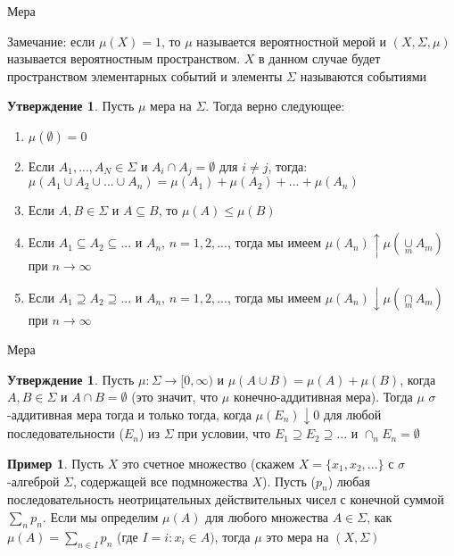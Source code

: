 \documentclass{beamer}%
\theoremstyle{definition}
\newtheorem{proposition}[theorem]{Утверждение}
\newtheorem{myexample}[theorem]{Пример}
\begin{document}
\begin{frame}{Мера}

Замечание: если $\mu(X) = 1$, то $\mu$ называется вероятностной мерой и $(X, \Sigma, \mu)$ называется вероятностным пространством.  $X$ в данном случае будет пространством элементарных событий и элементы $\Sigma$ называются событиями

\begin{proposition}
Пусть $\mu$ мера на $\Sigma$. Тогда верно следующее:
    \begin{enumerate}
        \item $\mu(\emptyset) = 0$
        \item Если $A_1,...,A_N \in \Sigma$ и $A_i \cap A_j =         \emptyset$ для $i \neq j$, тогда:
            $\mu(A_1 \cup A_2 \cup ... \cup A_n) = \mu(A_1) + \mu(A_2) + ... + \mu(A_n)$
        \item Если $A, B \in \Sigma$ и $A \subseteq B$, то $\mu(A) \leq \mu(B)$
        \item Если $A_1 \subseteq A_2 \subseteq ...$ и $A_n$, $n = 1,2,...$, тогда мы имеем $\mu(A_n) \uparrow \mu(\cup\limits_{m}A_m)$ при $n \rightarrow \infty$
        \item Если $A_1 \supseteq A_2 \supseteq ...$ и $A_n$, $n = 1,2,...$, тогда мы имеем $\mu(A_n) \downarrow \mu(\cap\limits_{m}A_m)$ при $n \rightarrow \infty$
    \end{enumerate}
\end{proposition}
    
\end{frame}

\begin{frame}{Мера}
    \begin{proposition}
        Пусть $\mu: \Sigma \rightarrow [0, \infty)$ и $\mu(A \cup B) = \mu(A) + \mu(B)$, когда $A, B \in \Sigma$ и $A \cap B = \emptyset$ (это значит, что $\mu$ конечно-аддитивная мера). Тогда $\mu$ $\sigma$-аддитивная мера тогда и только тогда, когда $\mu(E_n) \downarrow 0$ для любой последовательности ($E_n$) из $\Sigma$ при условии, что $E_1 \supseteq E_2 \supseteq ...$ и $\cap_{n} E_n = \emptyset$
    \end{proposition}
    \begin{myexample}
        Пусть $X$ это счетное множество (скажем $X = \{x_1, x_2, ...\}$ с $\sigma$-алгеброй $\Sigma$, содержащей все подмножества $X$). Пусть ($p_n$) любая последовательность неотрицательных действительных чисел с конечной суммой $\sum_n p_n$. Если мы определим $\mu(A)$ для любого множества $A \in \Sigma$, как $\mu(A) = \sum_{n \in I} p_n$ (где $I = {i: x_i \in A})$, тогда $\mu$ это мера на $(X, \Sigma)$
    \end{myexample}
\end{frame}
\end{document}
